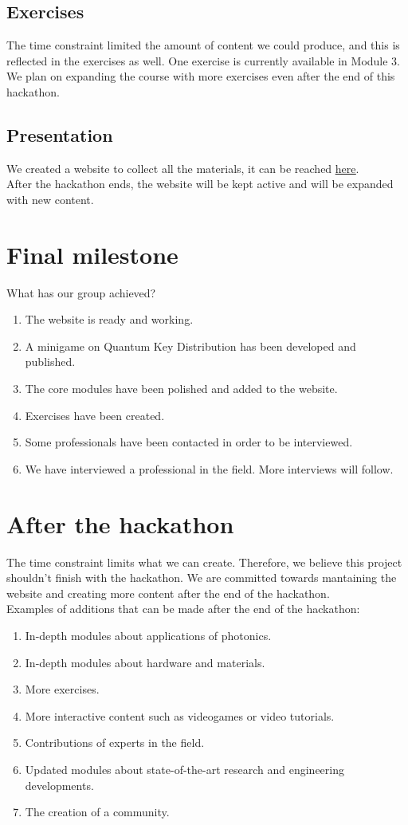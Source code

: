 \documentclass[hidelinks, a4paper,12pt]{article}
\begin{document}
\subsection{Exercises}
The time constraint limited the amount of content we could produce, and this is reflected in the exercises as well. One exercise is currently available in Module 3. We plan on expanding the course with more exercises even after the end of this hackathon.
\subsection{Presentation}
We created a website to collect all the materials, it can be reached \href{https://cosmcif.github.io/photonics-qworld-challenge/index.html}{\underline{here}}.\\After the hackathon ends, the website will be kept active and will be expanded with new content.
\newpage
\section{Final milestone}
What has our group achieved?
\begin{enumerate}
  \item The website is ready and working.
  \item A minigame on Quantum Key Distribution has been developed and published.
  \item The core modules have been polished and added to the website. 
  \item Exercises have been created.
  \item Some professionals have been contacted in order to be interviewed. 
  \item We have interviewed a professional in the field. More interviews will follow.
\end{enumerate}

\section{After the hackathon}
The time constraint limits what we can create. Therefore, we believe this project shouldn't finish with the hackathon. We are committed towards mantaining the website and creating more content after the end of the hackathon. \\
Examples of additions that can be made after the end of the hackathon:
\begin{enumerate}
  \item In-depth modules about applications of photonics.
  \item In-depth modules about hardware and materials.
  \item More exercises.
  \item More interactive content such as videogames or video tutorials.
  \item Contributions of experts in the field.
  \item Updated modules about state-of-the-art research and engineering developments.
  \item The creation of a community.
\end{enumerate}
\end{document}
